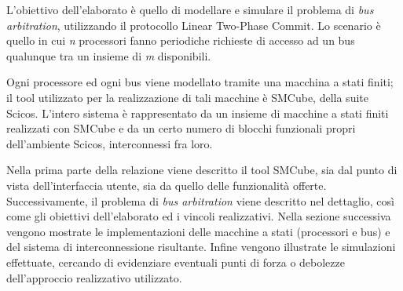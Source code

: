 L'obiettivo dell'elaborato è quello di modellare e simulare il problema di \textit{bus arbitration}, utilizzando il protocollo Linear Two-Phase Commit. Lo scenario è quello in cui \textit{n} processori fanno periodiche richieste di accesso ad un bus qualunque tra un insieme di \textit{m} disponibili.

Ogni processore ed ogni bus viene modellato tramite una macchina a stati finiti; il tool utilizzato per la realizzazione di tali macchine è SMCube, della suite Scicos. L'intero sistema è rappresentato da un insieme di macchine a stati finiti realizzati con SMCube e da un certo numero di blocchi funzionali propri dell'ambiente Scicos, interconnessi fra loro.

Nella prima parte della relazione viene descritto il tool SMCube, sia dal punto di vista dell'interfaccia utente, sia da quello delle funzionalità offerte. Successivamente, il problema di \textit{bus arbitration} viene descritto nel dettaglio, così come gli obiettivi dell'elaborato ed i vincoli realizzativi. Nella sezione successiva vengono mostrate le implementazioni delle macchine a stati (processori e bus) e del sistema di interconnessione risultante. Infine vengono illustrate le simulazioni effettuate, cercando di evidenziare eventuali punti di forza o debolezze dell'approccio realizzativo utilizzato.
